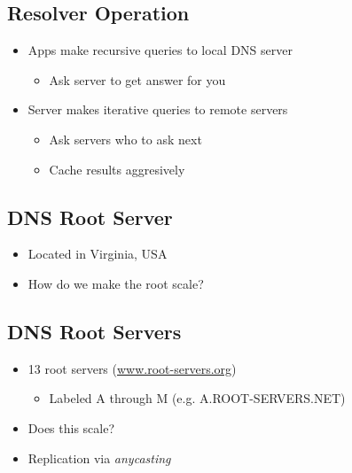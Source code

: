 \subsection{Resolver Operation}
\begin{itemize}[nosep]
    \item Apps make recursive queries to local DNS server
          \begin{itemize}[nosep]
              \item Ask server to get answer for you
          \end{itemize}
    \item Server makes iterative queries to remote servers
          \begin{itemize}[nosep]
              \item Ask servers who to ask next
              \item Cache results aggresively
          \end{itemize}
\end{itemize}
\subsection{DNS Root Server}
\begin{itemize}[nosep]
    \item Located in Virginia, USA
    \item How do we make the root scale?
\end{itemize}
\subsection{DNS Root Servers}
\begin{itemize}[nosep]
    \item 13 root servers (\url{www.root-servers.org})
          \begin{itemize}[nosep]
              \item Labeled A through M (e.g. A.ROOT-SERVERS.NET)
          \end{itemize}
    \item Does this scale?
    \item Replication via \emph{anycasting}
\end{itemize}
